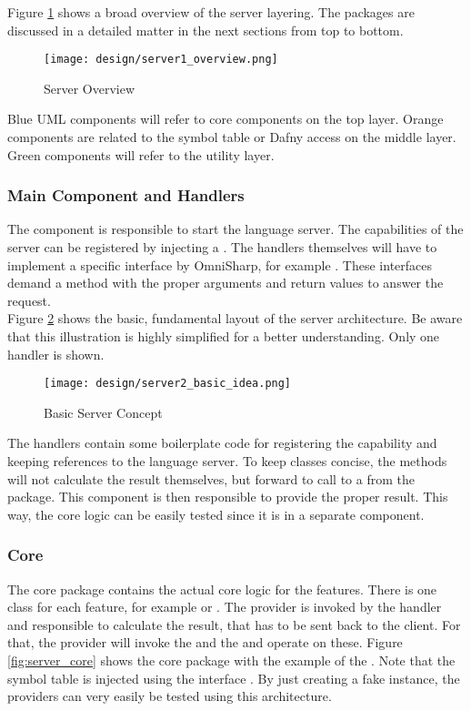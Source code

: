 Figure \ref{fig:server_overview} shows a broad overview of the server layering.
The packages are discussed in a detailed matter in the next sections from top to bottom.

\begin{figure}[H]
    \centering
    \texttt{[image: design/server1\_overview.png]}
    \caption{Server Overview}
    \label{fig:server_overview}
\end{figure}
Blue UML components will refer to core components on the top layer.
Orange components are related to the symbol table or Dafny access on the middle layer.
Green components will refer to the utility layer.


\subsubsection{Main Component and Handlers}
The  component is responsible to start the language server.
The capabilities of the server can be registered by injecting a .
The handlers themselves will have to implement a specific interface by OmniSharp, for example .
These interfaces demand a  method with the proper arguments and return values to answer the request.\\

Figure \ref{fig:server_basic_idea} shows the basic, fundamental layout of the server architecture.
Be aware that this illustration is highly simplified for a better understanding.
Only one handler is shown.\\

\begin{figure}[H]
    \centering
    \texttt{[image: design/server2\_basic\_idea.png]}
    \caption{Basic Server Concept}
    \label{fig:server_basic_idea}
\end{figure}

The handlers contain some boilerplate code for registering the capability and keeping references to the language server.
To keep classes concise, the  methods will not calculate the result themselves, but forward to call to a  from the  package.
This component is then responsible to provide the proper result.
This way, the core logic can be easily tested since it is in a separate component.\\

\subsubsection {Core}
The core package contains the actual core logic for the features.
There is one class for each feature, for example  or .
The provider is invoked by the handler and responsible to calculate the result, that has to be sent back to the client.
For that, the provider will invoke the  and the  and operate on these.
Figure \ref{fig:server_core} shows the core package with the example of the .
Note that the symbol table is injected using the interface .
By just creating a fake instance, the providers can very easily be tested using this architecture.

